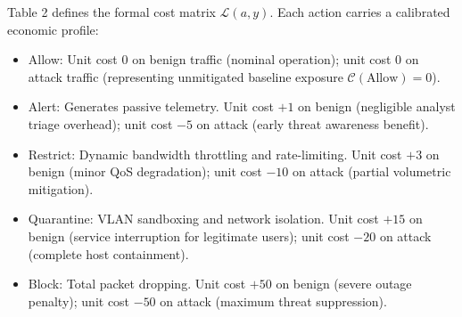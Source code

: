 \documentclass[journal,10pt,onecolumn]{IEEEtran}
\begin{document}
Table 2 defines the formal cost matrix $\mathcal{L}(a, y)$. Each action carries a calibrated economic profile:

\begin{table}[t]
\caption{Formal decision-theoretic cost matrix $\mathcal{L}(a, y)$ defining unit operational penalties and containment benefits across five response actions in Operational Cost Units (OCU).}
\label{tab:cost_matrix}
\centering
\small
{}
\end{table}
\begin{itemize}
  \item Allow: Unit cost 0 on benign traffic (nominal operation); unit cost 0 on attack traffic (representing unmitigated baseline exposure $\mathcal{C}(\text{Allow}) = 0$).
  \item Alert: Generates passive telemetry. Unit cost $+1$ on benign (negligible analyst triage overhead); unit cost $-5$ on attack (early threat awareness benefit).
  \item Restrict: Dynamic bandwidth throttling and rate-limiting. Unit cost $+3$ on benign (minor QoS degradation); unit cost $-10$ on attack (partial volumetric mitigation).
  \item Quarantine: VLAN sandboxing and network isolation. Unit cost $+15$ on benign (service interruption for legitimate users); unit cost $-20$ on attack (complete host containment).
  \item Block: Total packet dropping. Unit cost $+50$ on benign (severe outage penalty); unit cost $-50$ on attack (maximum threat suppression).
\end{itemize}
\end{document}
